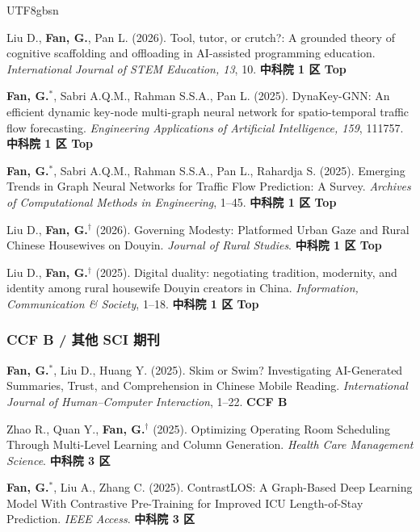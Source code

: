 \documentclass[a4paper,10pt]{article}
\newcommand{\pubitem}[1]{\item #1}
\begin{document}
\begin{CJK*}{UTF8}{gbsn}
\begin{enumerate}[label={[J\arabic*]}]
    \pubitem{Liu D., \textbf{Fan, G.}, Pan L. (2026). Tool, tutor, or crutch?: A grounded theory of cognitive scaffolding and offloading in AI-assisted programming education. \textit{International Journal of STEM Education, 13}, 10. \textbf{中科院 1 区 Top}}
    
    \pubitem{\textbf{Fan, G.}$^*$, Sabri A.Q.M., Rahman S.S.A., Pan L. (2025). DynaKey-GNN: An efficient dynamic key-node multi-graph neural network for spatio-temporal traffic flow forecasting. \textit{Engineering Applications of Artificial Intelligence, 159}, 111757. \textbf{中科院 1 区 Top}}
    
    \pubitem{\textbf{Fan, G.}$^*$, Sabri A.Q.M., Rahman S.S.A., Pan L., Rahardja S. (2025). Emerging Trends in Graph Neural Networks for Traffic Flow Prediction: A Survey. \textit{Archives of Computational Methods in Engineering}, 1--45. \textbf{中科院 1 区 Top}}
    
    \pubitem{Liu D., \textbf{Fan, G.}$^\dag$ (2026). Governing Modesty: Platformed Urban Gaze and Rural Chinese Housewives on Douyin. \textit{Journal of Rural Studies}. \textbf{中科院 1 区 Top}}
    
    \pubitem{Liu D., \textbf{Fan, G.}$^\dag$ (2025). Digital duality: negotiating tradition, modernity, and identity among rural housewife Douyin creators in China. \textit{Information, Communication \& Society}, 1--18. \textbf{中科院 1 区 Top}}
\end{enumerate}

\subsubsection*{CCF B / 其他 SCI 期刊}

\begin{enumerate}[label={[J\arabic*]}, resume]
    \pubitem{\textbf{Fan, G.}$^*$, Liu D., Huang Y. (2025). Skim or Swim? Investigating AI-Generated Summaries, Trust, and Comprehension in Chinese Mobile Reading. \textit{International Journal of Human--Computer Interaction}, 1--22. \textbf{CCF B}}
    
    \pubitem{Zhao R., Quan Y., \textbf{Fan, G.}$^\dag$ (2025). Optimizing Operating Room Scheduling Through Multi-Level Learning and Column Generation. \textit{Health Care Management Science}. \textbf{中科院 3 区}}
    
    \pubitem{\textbf{Fan, G.}$^*$, Liu A., Zhang C. (2025). ContrastLOS: A Graph-Based Deep Learning Model With Contrastive Pre-Training for Improved ICU Length-of-Stay Prediction. \textit{IEEE Access}. \textbf{中科院 3 区}}
\end{enumerate}


\end{CJK*}
\end{document}
